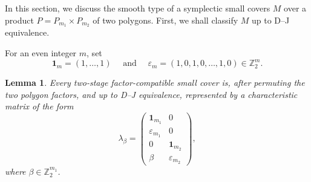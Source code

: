 \documentclass{amsart}
\newtheorem{lemma}[theorem]{Lemma}
\numberwithin{equation}{section}
\theoremstyle{definition}
\theoremstyle{remark}
\newcommand{\Z}{\mathbb Z}
\newcommand{\one}{\mathbf 1}
\begin{document}
In this section, we discuss the smooth type of a symplectic small covers $M$ over a product $P = P_{m_1}\times P_{m_2}$ of two polygons.
First, we shall classify $M$ up to D--J equivalence.

For an even integer $m$, set
$$
    \one_m=(1,\ldots,1) \quad \text{ and } \quad \varepsilon_m=(1,0,1,0,\ldots,1,0)\in \Z_2^{m}.
$$

\begin{lemma}\label{lem:two-stage-normal-form}
    Every two-stage factor-compatible small cover is, after permuting the two polygon factors, and up to
    D--J equivalence, represented by a characteristic matrix of the form
    \begin{equation}\label{eq:two-stage-normal-form}
        \lambda_\beta=
        \begin{pmatrix}
            \one_{m_1} & 0\\
            \varepsilon_{m_1} & 0\\
            0 & \one_{m_2}\\
            \beta & \varepsilon_{m_2}
        \end{pmatrix},
    \end{equation}
    where $\beta\in \Z_2^{m_1}$.
\end{lemma}
\end{document}
